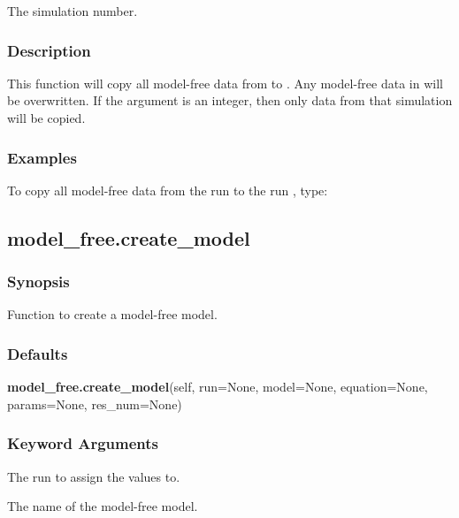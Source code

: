   The simulation number.

\subsubsection{Description}

This function will copy  all model-free data from 
 to 
.  Any model-free data in
 will be overwritten.  If the argument 
 is an integer, then only data from that
simulation will be copied.


\subsubsection{Examples}

To copy  all model-free data from the run 
 to the run 
, type:





\newpage

\subsection{model\_free.create\_model}


\subsubsection{Synopsis}

Function to create a model-free model.

\subsubsection{Defaults}

\textsf{\textbf{model\_free.create\_model}(self, run=None, model=None, equation=None, params=None, res\_num=None)}


\subsubsection{Keyword Arguments}


  The run to assign the values to.

  The name of the model-free model.


